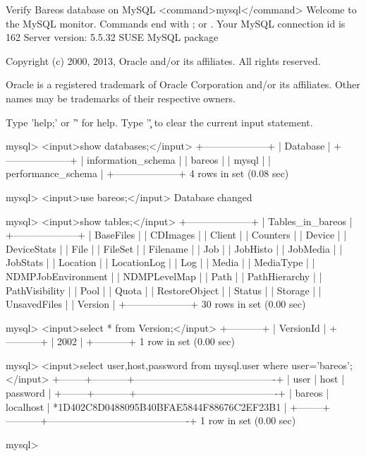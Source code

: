 \begin{commands}{Verify Bareos database on MySQL}
<command>mysql</command>
Welcome to the MySQL monitor.  Commands end with ; or \g.
Your MySQL connection id is 162
Server version: 5.5.32 SUSE MySQL package

Copyright (c) 2000, 2013, Oracle and/or its affiliates. All rights reserved.

Oracle is a registered trademark of Oracle Corporation and/or its
affiliates. Other names may be trademarks of their respective
owners.

Type 'help;' or '\h' for help. Type '\c' to clear the current input statement.

mysql> <input>show databases;</input>
+--------------------+
| Database           |
+--------------------+
| information_schema |
| bareos             |
| mysql              |
| performance_schema |
+--------------------+
4 rows in set (0.08 sec)

mysql> <input>use bareos;</input>
Database changed

mysql> <input>show tables;</input>
+--------------------+
| Tables_in_bareos   |
+--------------------+
| BaseFiles          |
| CDImages           |
| Client             |
| Counters           |
| Device             |
| DeviceStats        |
| File               |
| FileSet            |
| Filename           |
| Job                |
| JobHisto           |
| JobMedia           |
| JobStats           |
| Location           |
| LocationLog        |
| Log                |
| Media              |
| MediaType          |
| NDMPJobEnvironment |
| NDMPLevelMap       |
| Path               |
| PathHierarchy      |
| PathVisibility     |
| Pool               |
| Quota              |
| RestoreObject      |
| Status             |
| Storage            |
| UnsavedFiles       |
| Version            |
+--------------------+
30 rows in set (0.00 sec)

mysql> <input>select * from Version;</input>
+-----------+
| VersionId |
+-----------+
|      2002 |
+-----------+
1 row in set (0.00 sec)

mysql> <input>select user,host,password from mysql.user where user='bareos';</input>
+--------+-----------+-------------------------------------------+
| user   | host      | password                                  |
+--------+-----------+-------------------------------------------+
| bareos | localhost | *1D402C8D0488095B40BFAE5844F88676C2EF23B1 |
+--------+-----------+-------------------------------------------+
1 row in set (0.00 sec)

mysql>
\end{commands}




